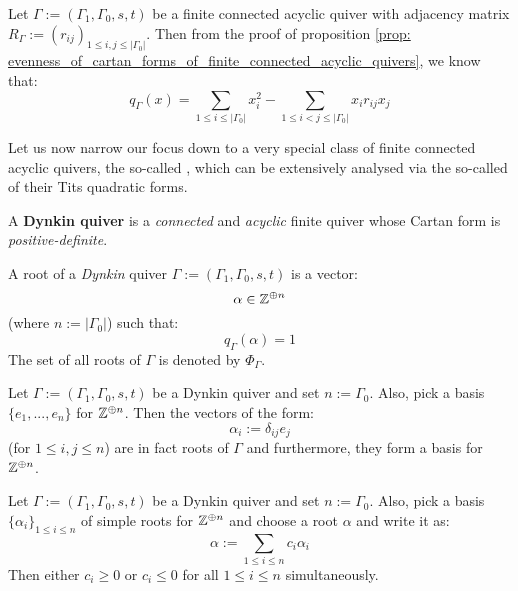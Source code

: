             \begin{remark}
                Let $\Gamma := (\Gamma_1, \Gamma_0, s, t)$ be a finite connected acyclic quiver with adjacency matrix $R_{\Gamma} := (r_{ij})_{1 \leq i, j \leq |\Gamma_0|}$. Then from the proof of proposition \ref{prop: evenness_of_cartan_forms_of_finite_connected_acyclic_quivers}, we know that:
                    $$q_{\Gamma}(x) = \sum_{1 \leq i \leq |\Gamma_0|} x_i^2 - \sum_{1 \leq i < j \leq |\Gamma_0|} x_i r_{ij} x_j$$
            \end{remark}
            
            Let us now narrow our focus down to a very special class of finite connected acyclic quivers, the so-called , which can be extensively analysed via the so-called  of their Tits quadratic forms.
            \begin{definition} \label{def: dynkin_quivers}
                A \textbf{Dynkin quiver} is a \textit{connected} and \textit{acyclic} finite quiver whose Cartan form is \textit{positive-definite}.
            \end{definition}
            \begin{remark}
                
            \end{remark}
            \begin{definition}[Roots] \label{def: roots_of_dynkin_quivers}
                A root of a \textit{Dynkin} quiver $\Gamma := (\Gamma_1, \Gamma_0, s, t)$ is a vector:
                    $$\alpha \in \mathbb{Z}^{\oplus n}$$
                (where $n := |\Gamma_0|$) such that:
                    $$q_{\Gamma}(\alpha) = 1$$
                The set of all roots of $\Gamma$ is denoted by $\Phi_{\Gamma}$.
            \end{definition}
            \begin{example} \label{example: simple_roots}
                Let $\Gamma := (\Gamma_1, \Gamma_0, s, t)$ be a Dynkin quiver and set $n := \Gamma_0$. Also, pick a basis $\{e_1, ..., e_n\}$ for $\mathbb{Z}^{\oplus n}$. Then the vectors of the form:
                    $$\alpha_i := \delta_{ij} e_j$$
                (for $1 \leq i, j \leq n$) are in fact roots of $\Gamma$ and furthermore, they form a basis for $\mathbb{Z}^{\oplus n}$.
            \end{example}
            \begin{lemma} \label{lemma: roots_are_exclusively_either_negative_or_positive}
                Let $\Gamma := (\Gamma_1, \Gamma_0, s, t)$ be a Dynkin quiver and set $n := \Gamma_0$. Also, pick a basis $\{\alpha_i\}_{1 \leq i \leq n}$ of simple roots for $\mathbb{Z}^{\oplus n}$ and choose a root $\alpha$ and write it as:
                    $$\alpha := \sum_{1 \leq i \leq n} c_i \alpha_i$$
                Then either $c_i \geq 0$ or $c_i \leq 0$ for all $1 \leq i \leq n$ simultaneously.
            \end{lemma}
